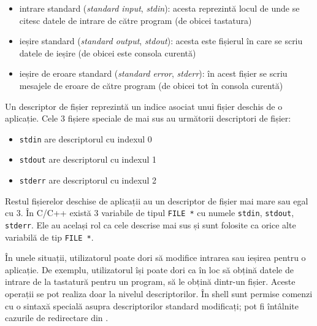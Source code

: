 \begin{itemize}
  \item intrare standard (\textit{standard input}, \textit{stdin}): acesta reprezintă locul de unde
		se citesc datele de intrare de către program (de obicei
		tastatura)
  \item ieșire standard (\textit{standard output}, \textit{stdout}): acesta este fișierul în care se
		scriu datele de ieșire (de obicei este consola curentă)
  \item ieșire de eroare standard (\textit{standard error}, \textit{stderr}): în acest fișier se scriu
		mesajele de eroare de către program (de obicei tot în consola
		curentă)
\end{itemize}

Un descriptor de fișier reprezintă un indice asociat unui fișier deschis de o
aplicație. Cele 3 fișiere speciale de mai sus au următorii descriptori de
fișier:

\begin{itemize}
  \item \texttt{stdin} are descriptorul cu indexul 0
  \item \texttt{stdout} are descriptorul cu indexul 1
  \item \texttt{stderr} are descriptorul cu indexul 2
\end{itemize}

Restul fișierelor deschise de aplicații au un descriptor de fișier mai mare sau
egal cu 3. În C/C++ există 3 variabile de tipul \texttt{FILE *} cu numele \texttt{stdin}, \texttt{stdout}, \texttt{stderr}.
Ele au același rol ca cele descrise mai sus și sunt folosite ca orice alte
variabilă de tip \texttt{FILE *}.

În unele situații, utilizatorul poate dori să modifice intrarea sau ieșirea
pentru o aplicație. De exemplu, utilizatorul își poate dori ca în loc să obțină
datele de intrare de la tastatură pentru un program, să le obțină dintr-un
fișier. Aceste operații se pot realiza doar la nivelul descriptorilor. În
shell sunt permise comenzi cu o sintaxă specială asupra descriptorilor
standard modificați; pot fi întâlnite cazurile de redirectare din .

